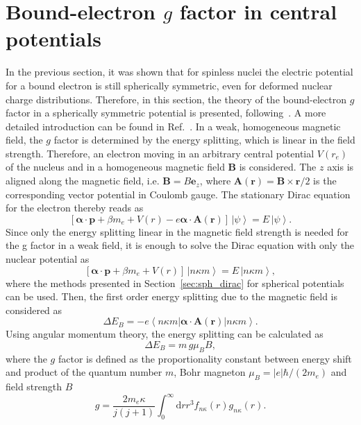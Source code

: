 \section{Bound-electron $g$ factor in central potentials}
\label{sec:gfac_intro}
In the previous section, it was shown that for spinless nuclei the electric potential for a bound electron is still spherically symmetric, even for deformed nuclear charge distributions. Therefore, in this section, the theory of the bound-electron $g$ factor in a spherically symmetric potential is presented, following~\cite{rose1961,Karshenboim2005}. A more detailed introduction can be found in Ref.~\cite{michel2015}. In a weak, homogeneous magnetic field, the $g$ factor is determined by the energy splitting, which is linear in the field strength. Therefore, an electron moving in an arbitrary central potential $V(r_e)$ of the nucleus and in a homogeneous magnetic field $\mathbf{B}$ is considered. The $z$ axis is aligned along the magnetic field, i.e. $\mathbf{B}=B\mathbf{e}_z$, where $\mathbf{A}(\mathbf{r})=\mathbf{B}\times \mathbf{r} /2$ is the corresponding vector potential in Coulomb gauge. The stationary Dirac equation for the electron thereby reads as
\begin{equation}
\left[\boldsymbol{\alpha}\cdot\mathbf{p}+\beta m_e + V(r) -e\boldsymbol{\alpha}\cdot\mathbf{A}(\mathbf{r})\right]\,\left|\psi\right> = E\,\left|\psi\right>.
\end{equation}
Since only the energy splitting linear in the magnetic field strength is needed for the g factor in a weak field, it is enough to solve the Dirac equation with only the nuclear potential as
\begin{equation}
\left[\boldsymbol{\alpha}\cdot\mathbf{p}+\beta m_e + V(r) \right]\,\left|n\kappa m\right> = E\,\left|n\kappa m\right>,
\end{equation}
where the methods presented in Section~\ref{sec:sph_dirac} for spherical potentials can be used. Then, the first order energy splitting due to the magnetic field is considered as
\begin{equation}
\Delta E_B = -e\left<n\kappa m\right|\boldsymbol{\alpha}\cdot\mathbf{A}(\mathbf{r})\left|n\kappa m\right>.
\end{equation}
Using angular momentum theory, the energy splitting can be calculated as $$\Delta E_B = m\, g \mu_B B,$$ where the $g$ factor is defined as the proportionality constant between energy shift and product of the quantum number $m$, Bohr magneton $\mu_B=|e|\hbar/(2m_e)$ and field strength $B$
\begin{equation}
g=\frac{2m_e\kappa}{j(j+1)}\int_0^\infty\mathrm{d}r r^3 f_{n\kappa}(r)g_{n\kappa}(r).
\label{eq:gfac_central}
\end{equation}
